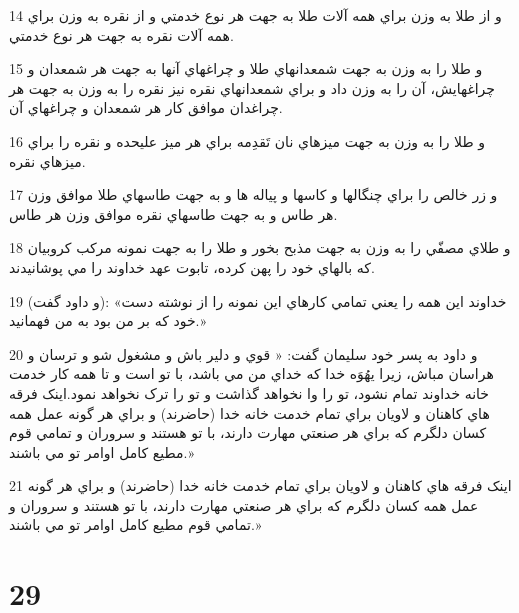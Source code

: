 \par 14 و از طلا به وزن براي همه آلات طلا به جهت هر نوع خدمتي و از نقره به وزن براي همه آلات نقره به جهت هر نوع خدمتي.
\par 15 و طلا را به وزن به جهت شمعدانهاي طلا و چراغهاي آنها به جهت هر شمعدان و چراغهايش، آن را به وزن داد و براي شمعدانهاي نقره نيز نقره را به وزن به جهت هر چراغدان موافق کار هر شمعدان و چراغهاي آن.
\par 16 و طلا را به وزن به جهت ميزهاي نان تَقدِمه براي هر ميز عليحده و نقره را براي ميزهاي نقره.
\par 17 و زر خالص را براي چنگالها و کاسها و پياله ها و به جهت طاسهاي طلا موافق وزن هر طاس و به جهت طاسهاي نقره موافق وزن هر طاس.
\par 18 و طلاي مصفّي را به وزن به جهت مذبح بخور و طلا را به جهت نمونه مرکب کروبيان که بالهاي خود را پهن کرده، تابوت عهد خداوند را مي پوشانيدند.
\par 19 (و داود گفت): «خداوند اين همه را يعني تمامي کارهاي اين نمونه را از نوشته دست خود که بر من بود به من فهمانيد.»
\par 20 و داود به پسر خود سليمان گفت: « قوي و دلير باش و مشغول شو و ترسان و هراسان مباش، زيرا يهُوَه خدا که خداي من مي باشد، با تو است و تا همه کار خدمت خانه خداوند تمام نشود، تو را وا نخواهد گذاشت و تو را ترک نخواهد نمود.اينک فرقه هاي کاهنان و لاويان براي تمام خدمت خانه خدا (حاضرند) و براي هر گونه عمل همه کسان دلگرم که براي هر صنعتي مهارت دارند، با تو هستند و سروران و تمامي قوم مطيع کامل اوامر تو مي باشند.»
\par 21 اينک فرقه هاي کاهنان و لاويان براي تمام خدمت خانه خدا (حاضرند) و براي هر گونه عمل همه کسان دلگرم که براي هر صنعتي مهارت دارند، با تو هستند و سروران و تمامي قوم مطيع کامل اوامر تو مي باشند.»
 
\chapter{29}

